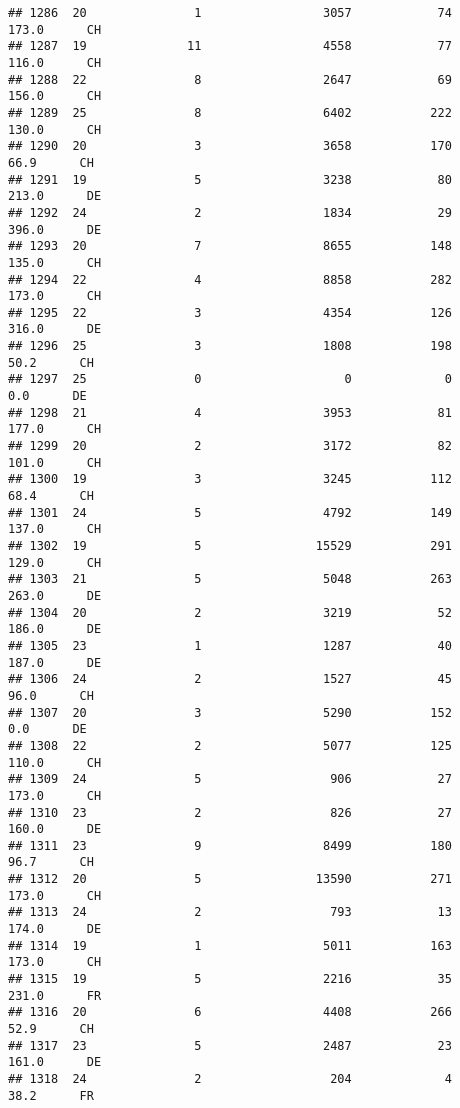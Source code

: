 \documentclass[
]{article}
\begin{document}
\begin{verbatim}
## 1286  20               1                 3057            74    173.0      CH
## 1287  19              11                 4558            77    116.0      CH
## 1288  22               8                 2647            69    156.0      CH
## 1289  25               8                 6402           222    130.0      CH
## 1290  20               3                 3658           170     66.9      CH
## 1291  19               5                 3238            80    213.0      DE
## 1292  24               2                 1834            29    396.0      DE
## 1293  20               7                 8655           148    135.0      CH
## 1294  22               4                 8858           282    173.0      CH
## 1295  22               3                 4354           126    316.0      DE
## 1296  25               3                 1808           198     50.2      CH
## 1297  25               0                    0             0      0.0      DE
## 1298  21               4                 3953            81    177.0      CH
## 1299  20               2                 3172            82    101.0      CH
## 1300  19               3                 3245           112     68.4      CH
## 1301  24               5                 4792           149    137.0      CH
## 1302  19               5                15529           291    129.0      CH
## 1303  21               5                 5048           263    263.0      DE
## 1304  20               2                 3219            52    186.0      DE
## 1305  23               1                 1287            40    187.0      DE
## 1306  24               2                 1527            45     96.0      CH
## 1307  20               3                 5290           152      0.0      DE
## 1308  22               2                 5077           125    110.0      CH
## 1309  24               5                  906            27    173.0      CH
## 1310  23               2                  826            27    160.0      DE
## 1311  23               9                 8499           180     96.7      CH
## 1312  20               5                13590           271    173.0      CH
## 1313  24               2                  793            13    174.0      DE
## 1314  19               1                 5011           163    173.0      CH
## 1315  19               5                 2216            35    231.0      FR
## 1316  20               6                 4408           266     52.9      CH
## 1317  23               5                 2487            23    161.0      DE
## 1318  24               2                  204             4     38.2      FR

\end{verbatim}
\end{document}
